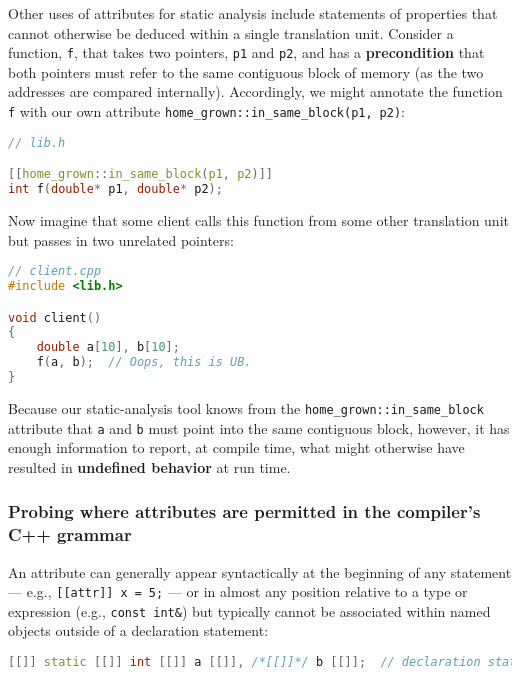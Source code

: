 Other uses of attributes for static analysis include statements of
properties that cannot otherwise be deduced within a single translation
unit. Consider a function, \texttt{f}, that takes two pointers,
\texttt{p1} and \texttt{p2}, and has a \textbf{precondition} that both
pointers must refer to the same contiguous block of memory (as the two
addresses are compared internally). Accordingly, we might annotate the
function \texttt{f} with our own attribute
\texttt{home\_grown::in\_same\_block(p1,}~\texttt{p2)}:

\begin{lstlisting}[language=C++]
// lib.h

[[home_grown::in_same_block(p1, p2)]]
int f(double* p1, double* p2);
\end{lstlisting}
    
\noindent Now imagine that some client calls this function from some other
translation unit but passes in two unrelated pointers:

\begin{lstlisting}[language=C++]
// client.cpp
#include <lib.h>

void client()
{
    double a[10], b[10];
    f(a, b);  // Oops, this is UB.
}
\end{lstlisting}
    
\noindent Because our static-analysis tool knows from the
\texttt{home\_grown::in\_same\_block} attribute that \texttt{a} and
\texttt{b} must point into the same contiguous block, however, it has
enough information to report, at compile time, what might otherwise have
resulted in \textbf{undefined behavior} at run time.

\subsubsection[Probing where attributes are permitted in the compiler’s C++ grammar]{Probing where attributes are permitted in the compiler’s C++ grammar}\label{probing-where-attributes-are-permitted-in-the-compiler’s-c++-grammar}

An attribute can generally appear syntactically at the beginning of any
statement --- e.g.,
\texttt{[[attr]]}~\texttt{x}~\texttt{=}~\texttt{5;} --- or in almost any
position relative to a type or expression (e.g.,
\texttt{const}~\texttt{int\&}) but typically cannot be associated
within named objects outside of a declaration statement:

\begin{lstlisting}[language=C++]
[[]] static [[]] int [[]] a [[]], /*[[]]*/ b [[]];  // declaration statement
\end{lstlisting}
    
